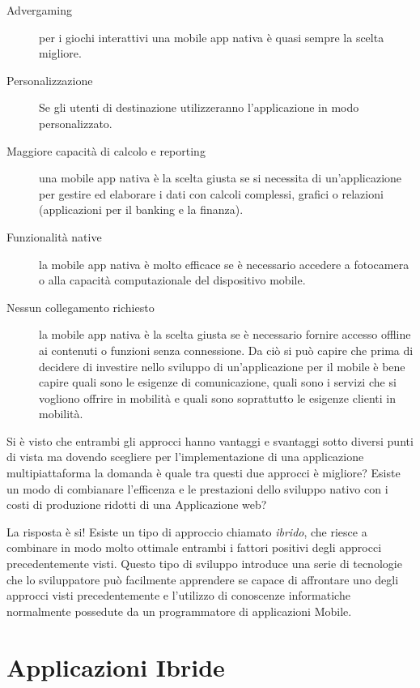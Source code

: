 \begin{description}
    \begin{description}
        \item[Advergaming] per i giochi interattivi una mobile app nativa è quasi sempre la scelta migliore.
        \item[Personalizzazione] Se gli utenti di destinazione utilizzeranno l'applicazione in modo personalizzato.
        \item[Maggiore capacità di calcolo  e reporting] una mobile app nativa è la scelta giusta se si necessita di un'applicazione per gestire ed elaborare i dati con calcoli complessi, grafici o relazioni (applicazioni per il banking e la finanza).
        \item[Funzionalità native] la mobile app nativa è molto efficace  se è necessario accedere a fotocamera o alla capacità computazionale del dispositivo mobile.
        \item[Nessun collegamento richiesto]la mobile app nativa è la scelta giusta se è necessario fornire accesso offline ai contenuti o funzioni senza connessione. Da ciò si può capire che prima di decidere di investire nello sviluppo di un'applicazione per il mobile è bene capire quali sono le esigenze di comunicazione, quali sono i servizi che si vogliono offrire in mobilità e quali sono soprattutto le esigenze clienti in mobilità.
    \end{description}
\end{description}

Si è visto che entrambi gli approcci hanno vantaggi e svantaggi sotto diversi punti di vista ma dovendo scegliere per l'implementazione di una applicazione multipiattaforma la domanda è quale tra questi due approcci è migliore? Esiste un modo di combianare l'efficenza e le prestazioni dello sviluppo nativo con i costi di produzione ridotti di una Applicazione web?

La risposta è si! Esiste un tipo di approccio chiamato \emph{ibrido}, che riesce a combinare in modo molto ottimale entrambi i fattori positivi degli approcci precedentemente visti. Questo tipo di sviluppo introduce una serie di tecnologie che lo sviluppatore può facilmente apprendere se capace di affrontare uno degli approcci visti precedentemente e l'utilizzo di conoscenze informatiche normalmente possedute da un programmatore di applicazioni Mobile.
\section{Applicazioni Ibride}
\label{sec:hybridApp}

